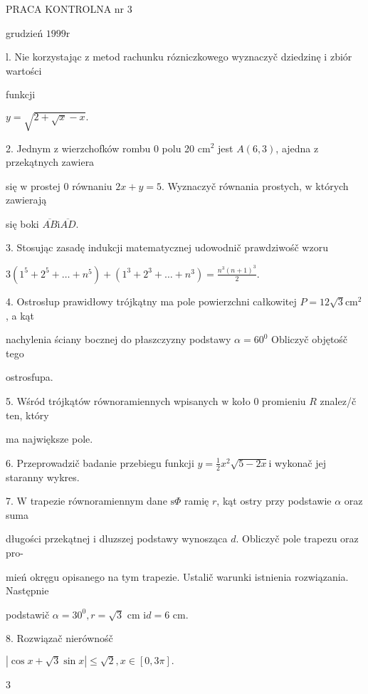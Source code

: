 \documentclass[a4paper,12pt]{article}
\begin{document}
PRACA KONTROLNA nr 3

grudzień $1999\mathrm{r}$

l. Nie korzystając $\mathrm{z}$ metod rachunku rózniczkowego wyznaczyč dziedzinę $\mathrm{i}$ zbiór wartości

funkcji

$y=\sqrt{2+\sqrt{x}-x}.$

2. Jednym $\mathrm{z}$ wierzchofków rombu $0$ polu 20 $\mathrm{c}\mathrm{m}^{2}$ jest $A(6,3)$, ajedna $\mathrm{z}$ przekątnych zawiera

się $\mathrm{w}$ prostej $0$ równaniu $2x+y=5$. Wyznaczyč równania prostych, $\mathrm{w}$ których zawierają

się boki $\overline{AB} \mathrm{i} \overline{AD}.$

3. Stosując zasadę indukcji matematycznej udowodnič prawdziwośč wzoru

$3(1^{5}+2^{5}+\displaystyle \ldots+n^{5})+(1^{3}+2^{3}+\ldots+n^{3})=\frac{n^{3}(n+1)^{3}}{2}.$

4. Ostrosłup prawidłowy trójkątny ma pole powierzchni całkowitej $P = 12\sqrt{3}\mathrm{c}\mathrm{m}^{2}$, a kąt

nachylenia ściany bocznej do płaszczyzny podstawy $\alpha = 60^{0}$ Obliczyč objętośč tego

ostrosfupa.

5. Wśród trójkątów równoramiennych wpisanych $\mathrm{w}$ koło $0$ promieniu $R$ znalez/č ten, który

ma największe pole.

6. Przeprowadzič badanie przebiegu funkcji $y=\displaystyle \frac{1}{2}x^{2}\sqrt{5-2x}\mathrm{i}$ wykonač jej staranny wykres.

7. $\mathrm{W}$ trapezie równoramiennym dane $\mathrm{s}\Phi$ ramię $r$, kąt ostry przy podstawie $\alpha$ oraz suma

długości przekątnej $\mathrm{i}$ dluzszej podstawy wynosząca $d$. Obliczyč pole trapezu oraz pro-

mień okręgu opisanego na tym trapezie. Ustalič warunki istnienia rozwiązania. Następnie

podstawič $\alpha=30^{0}, r=\sqrt{3}$ cm $\mathrm{i} d=6$ cm.

8. Rozwiązač nierównośč

$|\cos x+\sqrt{3}\sin x|\leq\sqrt{2},x\in[0,3\pi].$

3
\end{document}
